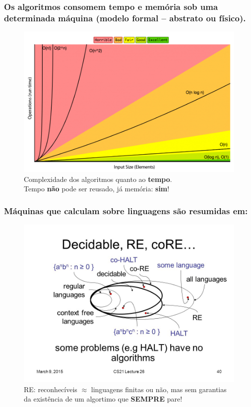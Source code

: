 \documentclass[10pt]{beamer}
\begin{document}


\begin{frame}[fragile]

\frametitle{\normalsize{Os algoritmos  consomem \textbf{tempo} e \textbf{memória} sob uma determinada máquina (modelo formal -- abstrato ou físico). }}

\begin{figure}[!ht]
	\centering
	\includegraphics[height =.64\textheight,width=.8\textwidth]
	{figuras/complexidade_algo.png}
	\caption{Complexidade dos algoritmos quanto ao \textbf{tempo}.\\Tempo \textbf{não} pode ser reusado, já memória: \textbf{sim}!}
\end{figure}

\end{frame}


\begin{frame}[fragile]

\frametitle{Máquinas que calculam sobre linguagens são resumidas em:}

\begin{figure}[!ht]
\centering
\includegraphics[height =.65\textheight,width=.85\textwidth]
{figuras/some+problems+have+no+algorithms_HALT.jpg}
\caption{RE: reconhecíveis $\approx $ linguagens finitas ou não, mas sem garantias da existência de um algortimo que \textbf{SEMPRE} pare!}
\end{figure}

\end{frame}
\end{document}
